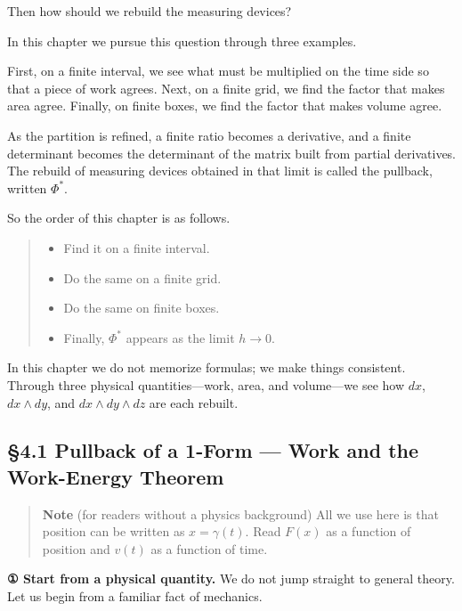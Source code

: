 \documentclass[a4paper,12pt,openany]{book}
\begin{document}
Then how should we rebuild the measuring devices?

In this chapter we pursue this question through three examples.

First, on a finite interval, we see what must be multiplied on the time
side so that a piece of work agrees. Next, on a finite grid, we find the
factor that makes area agree. Finally, on finite boxes, we find the
factor that makes volume agree.

As the partition is refined, a finite ratio becomes a derivative, and a
finite determinant becomes the determinant of the matrix built from
partial derivatives. The rebuild of measuring devices obtained in that
limit is called the pullback, written \(\Phi^*\).

So the order of this chapter is as follows.

\begin{quote}
\begin{itemize}
\item
  Find it on a finite interval.
\item
  Do the same on a finite grid.
\item
  Do the same on finite boxes.
\item
  Finally, \(\Phi^*\) appears as the limit \(h\to0\).
\end{itemize}
\end{quote}

In this chapter we do not memorize formulas; we make things consistent.
Through three physical quantities—work, area, and volume—we see how
\(dx\), \(dx \wedge dy\), and \(dx \wedge dy \wedge dz\) are each
rebuilt.

\hypertarget{pullback-of-a-1-form-work-and-the-work-energy-theorem}{%
\subsection{§4.1 Pullback of a 1-Form — Work and the Work-Energy
Theorem}\label{pullback-of-a-1-form-work-and-the-work-energy-theorem}}

\begin{quote}
\textbf{Note} (for readers without a physics background) All we use here
is that position can be written as \(x=\gamma(t)\). Read \(F(x)\) as a
function of position and \(v(t)\) as a function of time.
\end{quote}

\textbf{① Start from a physical quantity.} We do not jump straight to
general theory. Let us begin from a familiar fact of mechanics.
\end{document}
